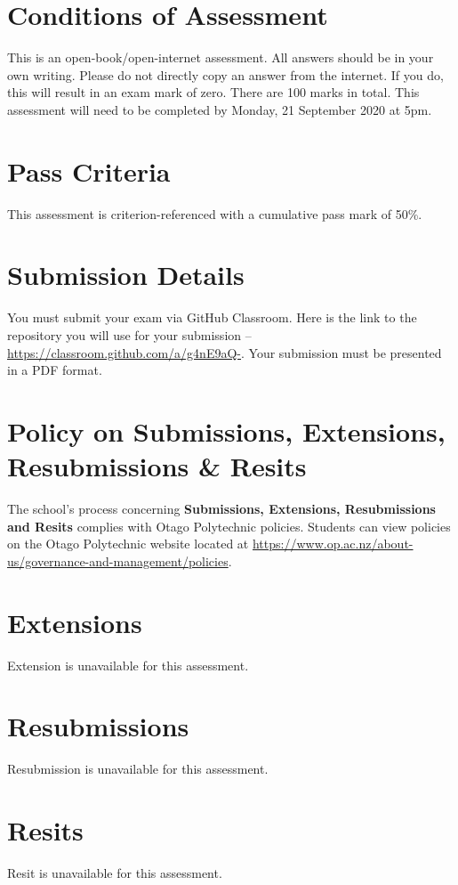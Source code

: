 \documentclass{article}
\begin{document}
\section*{Conditions of Assessment}
This is an open-book/open-internet assessment. All answers should be in your own writing. Please do not directly copy an answer from the internet. If you do, this will result in an exam mark of zero. There are 100 marks in total. This assessment will need to be completed by Monday, 21 September 2020 at 5pm.

\section*{Pass Criteria}
This assessment is criterion-referenced with a cumulative pass mark of 50\%.

\section*{Submission Details}
You must submit your exam via GitHub Classroom. Here is the link to the repository you will use for your submission – \href{https://classroom.github.com/a/g4nE9aQ-}{https://classroom.github.com/a/g4nE9aQ-}. Your submission must be presented in a PDF format. 

\section*{Policy on Submissions, Extensions, Resubmissions \& Resits}
The school's process concerning \textbf{Submissions, Extensions, Resubmissions and Resits} complies with Otago Polytechnic policies. Students can view policies on the Otago Polytechnic website located at \href{https://www.op.ac.nz/about-us/governance-and-management/policies}{https://www.op.ac.nz/about-us/governance-and-management/policies}.

\section*{Extensions}
Extension is unavailable for this assessment. 

\section*{Resubmissions}
Resubmission is unavailable for this assessment.

\section*{Resits} 
Resit is unavailable for this assessment.
\end{document}
